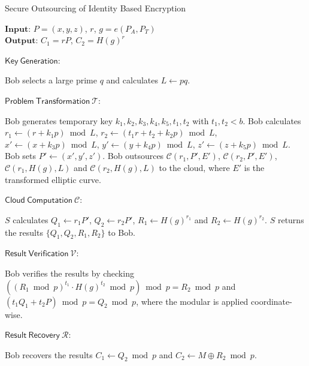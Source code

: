 \documentclass[english,draftcls,onecolumn,11pt]{IEEEtran}
\theoremstyle{definition}
\theoremstyle{plain}
\theoremstyle{plain}
\theoremstyle{definition}
\begin{document}
\begin{algorithm}[tbh] 
\caption{Secure Outsourcing of Identity Based Encryption\label{alg:SecureIBE}}

$\mathbf{Input}$: $P=(x,y,z)$, $r$, $g=e(P_A,P_T)$\\
$\mathbf{Output}$: $C_1=rP$, $C_2 = H(g)^r$

$\mathsf{Key~Generation}$:  
\begin{algorithmic}[1] 
\STATE Bob selects a large prime $q$ and calculates $L\leftarrow pq$. 
\end{algorithmic} 
\smallskip 
$\mathsf{Problem~Transformation}~\mathcal{T}$:  
\begin{algorithmic}[1] 
\STATE Bob generates temporary key $k_1, k_2, k_3, k_4, k_5, t_1,t_2$ with $t_1,t_2<b$.
\STATE Bob calculates $r_1\leftarrow (r+k_1 p)\bmod L$, $r_2\leftarrow (t_1r+t_2+k_2 p)\bmod L$, $x'\leftarrow (x+k_3 p)\bmod L$, $y'\leftarrow (y+k_4 p)\bmod L$, $z'\leftarrow (z+k_5 p)\bmod L$. Bob sets $P' \leftarrow (x',y',z')$.
\STATE Bob outsources $\mathcal{C}(r_1,P',E')$, $\mathcal{C}(r_2,P',E')$, $\mathcal{C}(r_1,H(g),L)$ and $\mathcal{C}(r_2,H(g),L)$ to the
cloud, where $E'$ is the transformed elliptic curve.
\end{algorithmic} 

\smallskip
$\mathsf{Cloud~Computation}~\mathcal{C}$:
\begin{algorithmic}[1] 
\STATE $S$ calculates $Q_1 \leftarrow r_1 P'$, $Q_2 \leftarrow r_2 P'$, $R_1 \leftarrow H(g)^{r_1}$ and $R_2 \leftarrow H(g)^{r_2}$.  
\STATE $S$ returns the results $\{Q_1, Q_2, R_1, R_2\}$ to Bob.
\end{algorithmic} 

\smallskip
$\mathsf{Result~Verification}~\mathcal{V}$:
\begin{algorithmic}[1] 
\STATE Bob verifies the results by checking $((R_1\bmod p)^{t_1}\cdot H(g)^{t_2}\bmod p)\bmod p=R_2\bmod p$ and $ (t_1 Q_1 + t_2 P)\bmod p =Q_2 \bmod p$, where the modular is applied coordinate-wise.
\end{algorithmic} 

\smallskip
$\mathsf{Result~Recovery}~\mathcal{R}$:
\begin{algorithmic}[1] 
\STATE Bob  recovers the results $C_1 \leftarrow Q_2\bmod p$ and $C_2 \leftarrow M  \oplus R_2\bmod p$.
\end{algorithmic} 
\end{algorithm}
\end{document}
